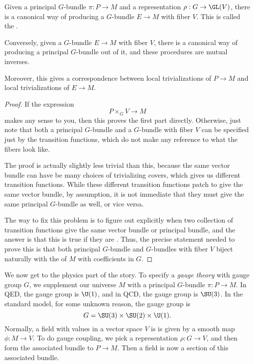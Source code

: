\documentclass[a4paper]{article}
\begin{document}
\begin{thm}
  Given a principal $G$-bundle $\pi: P \to M$ and a representation $\rho: G \to \GL(V)$, there is a canonical way of producing a $G$-bundle $E \to M$ with fiber $V$. This is called the .

  Conversely, given a $G$-bundle $E\to M$ with fiber $V$, there is a canonical way of producing a principal $G$-bundle out of it, and these procedures are mutual inverses.

  Moreover, this gives a correspondence between local trivializations of $P \to M$ and local trivializations of $E \to M$.
\end{thm}

\begin{proof}
  If the expression
  \[
    P \times_G V \to M
  \]
  makes any sense to you, then this proves the first part directly. Otherwise, just note that both a principal $G$-bundle and a $G$-bundle with fiber $V$ can be specified just by the transition functions, which do not make any reference to what the fibers look like.

  The proof is actually slightly less trivial than this, because the same vector bundle can have be many choices of trivializing covers, which gives us different transition functions. While these different transition functions patch to give the same vector bundle, by assumption, it is not immediate that they must give the same principal $G$-bundle as well, or vice versa.

  The way to fix this problem is to figure out explicitly when two collection of transition functions give the same vector bundle or principal bundle, and the answer is that this is true if they are . Thus, the precise statement needed to prove this is that both principal $G$-bundle and $G$-bundles with fiber $V$ biject naturally with the  of $M$ with coefficients in $G$.
\end{proof}

We now get to the physics part of the story. To specify a \emph{gauge theory} with gauge group $G$, we supplement our universe $M$ with a principal $G$-bundle $\pi: P \to M$. In QED, the gauge group is $\U(1)$, and in QCD, the gauge group is $\SU(3)$. In the standard model, for some unknown reason, the gauge group is
\[
  G = \SU(3) \times \SU(2) \times \U(1).
\]
Normally, a field with values in a vector space $V$ is is given by a smooth map $\phi: M \to V$. To do gauge coupling, we pick a representation $\rho: G \to V$, and then form the associated bundle to $P \to M$. Then a field is now a section of this associated bundle.
\end{document}
